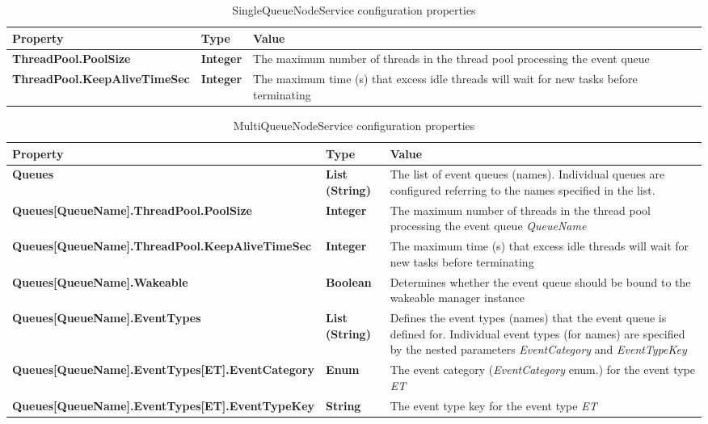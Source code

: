 \begin{table}
\scriptsize
\begin{center}
\begin{tabular}{p{6.3cm} p{0.9cm} p{7.3cm}}
	\hline
	\textbf{Property}							& \textbf{Type}						& \textbf{Value}					\\[1mm]
    \hline
	\textbf{ThreadPool.PoolSize}				& \textbf{Integer}					& The maximum number of threads in the thread pool processing the event queue					\\[1.5mm]	
	\textbf{ThreadPool.KeepAliveTimeSec}		& \textbf{Integer}					& The maximum time (s) that excess idle threads will wait for new tasks before terminating		\\[1.5mm]	
    \hline
\end{tabular}
\end{center}
\caption{SingleQueueNodeService configuration properties}
\label{tab:libSingleQueueNodeService}
\end{table}


\begin{table}
\scriptsize
\begin{center}
\begin{tabular}{p{6.3cm} p{0.9cm} p{7.3cm}}
	\hline
	\textbf{Property}											& \textbf{Type}						& \textbf{Value}					\\[1mm]
    \hline
	\textbf{Queues}												& \textbf{List (String)}			& The list of event queues (names). Individual queues are configured referring to the names specified in the list.		\\[1.5mm]	
	\textbf{Queues[QueueName].ThreadPool.PoolSize}				& \textbf{Integer}					& The maximum number of threads in the thread pool processing the event queue \emph{QueueName}		\\[1.5mm]	
	\textbf{Queues[QueueName].ThreadPool.KeepAliveTimeSec}		& \textbf{Integer}					& The maximum time (s) that excess idle threads will wait for new tasks before terminating			\\[1.5mm]	
	\textbf{Queues[QueueName].Wakeable}							& \textbf{Boolean}					& Determines whether the event queue should be bound to the wakeable manager instance					\\[1.5mm]	
	\textbf{Queues[QueueName].EventTypes}						& \textbf{List (String)}			& Defines the event types (names) that the event queue is defined for. Individual event types (for names) are specified by the nested parameters \emph{EventCategory} and \emph{EventTypeKey}			\\[1.5mm]	
	\textbf{Queues[QueueName].EventTypes[ET].EventCategory}		& \textbf{Enum}						& The event category (\emph{EventCategory} enum.) for the event type \emph{ET}						\\[1.5mm]	
	\textbf{Queues[QueueName].EventTypes[ET].EventTypeKey}		& \textbf{String}					& The event type key for the event type \emph{ET}						\\[1.5mm]	
    \hline
\end{tabular}
\end{center}
\caption{MultiQueueNodeService configuration properties}
\label{tab:libMultiQueueNodeService}
\end{table}


